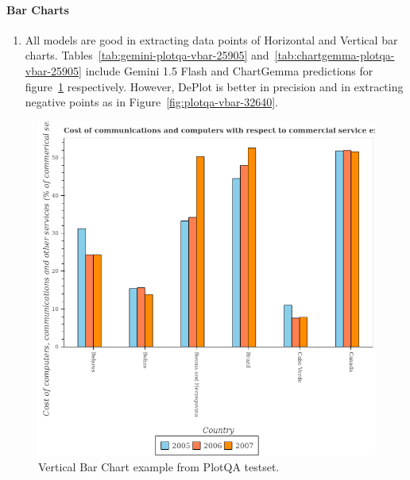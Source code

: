 \documentclass[
	letterpaper, %
]{jdf}
\begin{document}
\paragraph{Bar Charts}\label{par:bar-errors}
\begin{enumerate}
    \item All models are good in extracting data points of Horizontal and Vertical bar charts.
    Tables~\ref{tab:gemini-plotqa-vbar-25905} and~\ref{tab:chartgemma-plotqa-vbar-25905} include Gemini 1.5 Flash and ChartGemma predictions for figure~\ref{fig:plotqa-vbar-25905} respectively.
        However, DePlot is better in precision and in extracting negative points as in Figure~\ref{fig:plotqa-vbar-32640}.
       \end{enumerate}
\begin{figure}
   \includegraphics{test-sample/plotqa/images/vertical-bar/25905.png}
   \caption{Vertical Bar Chart example from PlotQA testset.}\label{fig:plotqa-vbar-25905}
   \end{figure}



\end{document}
